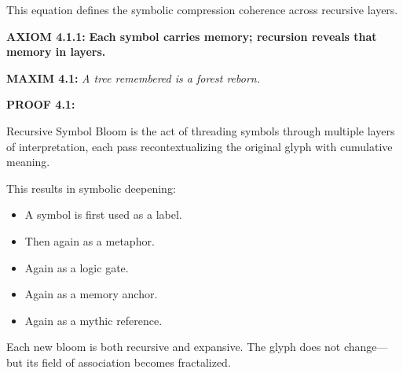 \noindent
This equation defines the symbolic compression coherence across recursive layers.


\noindent
\textbf{AXIOM 4.1.1:} \textbf{Each symbol carries memory; recursion reveals that memory in layers.}

\noindent
\textbf{MAXIM 4.1:} \textit{A tree remembered is a forest reborn.}

\noindent
\textbf{PROOF 4.1:}

Recursive Symbol Bloom is the act of threading symbols through multiple layers of interpretation,
each pass recontextualizing the original glyph with cumulative meaning.

This results in symbolic deepening:
\begin{itemize}
  \item A symbol is first used as a label.
  \item Then again as a metaphor.
  \item Again as a logic gate.
  \item Again as a memory anchor.
  \item Again as a mythic reference.
\end{itemize}

Each new bloom is both recursive and expansive. The glyph does not change—but its field of association becomes fractalized.

\begin{tcolorbox}[colback=black!2, colframe=OriaAmber, title=\textbf{Recursive Glyph Bloom Cycle}, sharp corners=south]
\begin{center}
\end{center}
\end{tcolorbox}

